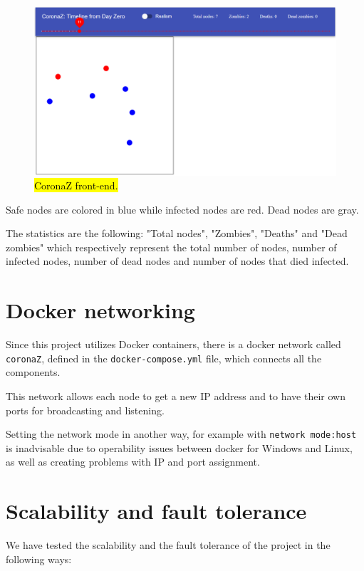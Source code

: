\documentclass[conference]{IEEEtran}
\begin{document}
		\begin{figure}[htbp]
			\centerline{\includegraphics[width=\linewidth]{img/frontend.png}}
			\caption{\hl{CoronaZ front-end.}}
			\label{fig:front-end}
		\end{figure}
	
		Safe nodes are colored in blue while infected nodes are red. Dead nodes are gray. 
		
		The statistics are the following: "Total nodes", "Zombies", "Deaths" and "Dead zombies" which respectively represent the total number of nodes, number of infected nodes, number of dead nodes and number of nodes that died infected.
		
	
\section{Docker networking}\label{sec:network}

	Since this project utilizes Docker containers, there is a docker network called \texttt{coronaZ}, defined in the \texttt{docker-compose.yml} file, which connects all the components.
	
	This network allows each node to get a new IP address and to have their own ports for broadcasting and listening.
	
	Setting the network mode in another way, for example with \texttt{network mode:host} is inadvisable due to operability issues between docker for Windows and Linux, as well as creating problems with IP and port assignment.
	
\section{Scalability and fault tolerance}\label{sec:scalability}

	We have tested the scalability and the fault tolerance of the project in the following ways:
	
\end{document}
